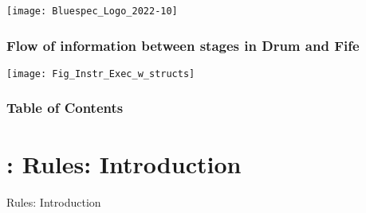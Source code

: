 


\date{L13: {\BSV}: Rules and their semantics}





\begin{frame}
 \titlepage

 \begin{center}
  \texttt{[image: Bluespec\_Logo\_2022-10]}
 \end{center}

\end{frame}





\begin{frame}
\frametitle{Flow of information between stages in Drum and Fife}

\footnotesize

\begin{center}
 \texttt{[image: Fig\_Instr\_Exec\_w\_structs]}
\end{center}

\end{frame}


\begin{frame}
\frametitle{Table of Contents}

\tableofcontents

\end{frame}


\section{{\BSV}: Rules: Introduction}

\begin{frame}

\begin{center}
  {\LARGE Rules: Introduction}
\end{center}

\end{frame}

